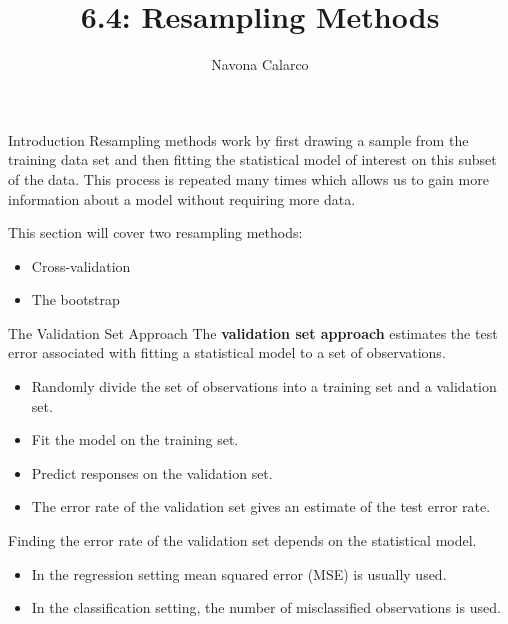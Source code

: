 \documentclass[
  ignorenonframetext,
  aspectratio=169,
]{beamer}
\title{6.4: Resampling Methods}
\author{Navona Calarco}
\date{}
\institute{The University of Toronto}
\begin{document}
\frame{\titlepage}
\ifdefined\Shaded\renewenvironment{Shaded}{\begin{tcolorbox}[boxrule=0pt, frame hidden, enhanced, interior hidden, sharp corners, breakable, borderline west={3pt}{0pt}{shadecolor}]}{\end{tcolorbox}}\fi

\begin{frame}{Introduction}
\protect\hypertarget{introduction}{}
Resampling methods work by first drawing a sample from the training data
set and then fitting the statistical model of interest on this subset of
the data. This process is repeated many times which allows us to gain
more information about a model without requiring more data.

This section will cover two resampling methods:

\begin{itemize}
\item
  Cross-validation
\item
  The bootstrap
\end{itemize}
\end{frame}

\begin{frame}{The Validation Set Approach}
\protect\hypertarget{the-validation-set-approach}{}
The \textbf{validation set approach} estimates the test error associated
with fitting a statistical model to a set of observations.

\begin{itemize}
\item
  Randomly divide the set of observations into a \alert{training set}
  and a \alert{validation set}.
\item
  Fit the model on the training set.
\item
  Predict responses on the validation set.
\item
  The error rate of the validation set gives an estimate of the test
  error rate.
\end{itemize}

Finding the error rate of the validation set depends on the statistical
model.

\begin{itemize}
\item
  In the regression setting mean squared error (MSE) is usually used.
\item
  In the classification setting, the number of misclassified
  observations is used.
\end{itemize}
\end{frame}
\end{document}
